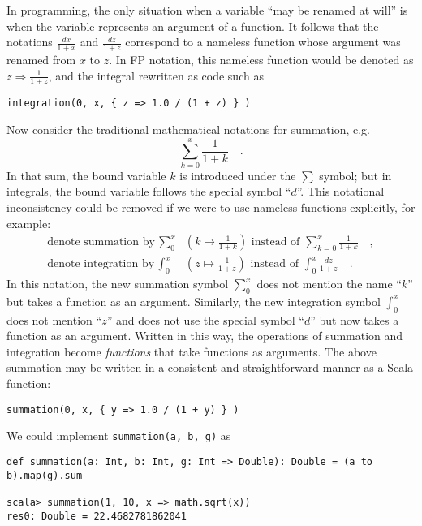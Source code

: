 In programming, the only situation when a variable ``may be renamed
at will'' is when the variable represents an argument of a function.
It follows that the notations $\frac{dx}{1+x}$ and $\frac{dz}{1+z}$
correspond to a nameless function whose argument was renamed from
$x$ to $z$. In FP notation, this nameless function would be denoted
as $z\Rightarrow\frac{1}{1+z}$, and the integral rewritten as code
such as
\begin{lstlisting}
integration(0, x, { z => 1.0 / (1 + z) } )
\end{lstlisting}
Now consider the traditional mathematical notations for summation,
e.g.
\[
\sum_{k=0}^{x}\frac{1}{1+k}\quad.
\]
In that sum, the bound variable $k$ is introduced under the $\sum$
symbol; but in integrals, the bound variable follows the special symbol
``$d$''. This notational inconsistency could be removed if we were
to use nameless functions explicitly, for example:
\begin{align*}
\text{denote summation by }\sum_{0}^{x} & \left(k\mapsto\frac{1}{1+k}\right)\text{ instead of }\sum_{k=0}^{x}\frac{1}{1+k}\quad,\\
\text{denote integration by }\int_{0}^{x} & \left(z\mapsto\frac{1}{1+z}\right)\text{ instead of }\int_{0}^{x}\frac{dz}{1+z}\quad.
\end{align*}
In this notation, the new summation symbol $\sum_{0}^{x}$ does not
mention the name \textquotedblleft $k$\textquotedblright{} but takes
a function as an argument. Similarly, the new integration symbol $\int_{0}^{x}$
does not mention ``$z$'' and does not use the special symbol ``$d$''
but now takes a function as an argument. Written in this way, the
operations of summation and integration become \emph{functions} that
take functions as arguments. The above summation may be written in
a consistent and straightforward manner as a Scala function:
\begin{lstlisting}
summation(0, x, { y => 1.0 / (1 + y) } )
\end{lstlisting}

We could implement \texttt{}\lstinline!summation(a, b, g)! as
\begin{lstlisting}
def summation(a: Int, b: Int, g: Int => Double): Double = (a to b).map(g).sum

scala> summation(1, 10, x => math.sqrt(x))
res0: Double = 22.4682781862041
\end{lstlisting}

